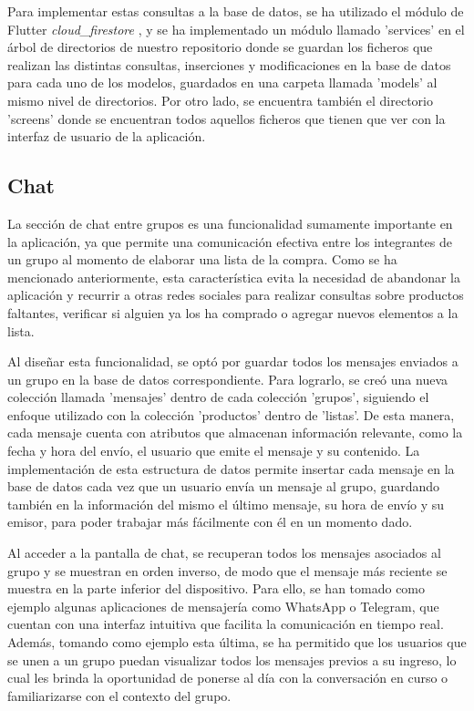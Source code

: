 \documentclass{article}
\begin{document}
Para implementar estas consultas a la base de datos, se ha utilizado el módulo de Flutter \textit{cloud\_firestore} \cite{Firebase Cloud Firestore}, y se ha implementado un módulo llamado 'services' en el árbol de directorios de nuestro repositorio donde se guardan los ficheros que realizan las distintas consultas, inserciones y modificaciones en la base de datos para cada uno de los modelos, guardados en una carpeta llamada 'models' al mismo nivel de directorios. Por otro lado, se encuentra también el directorio 'screens' donde se encuentran todos aquellos ficheros que tienen que ver con la interfaz de usuario de la aplicación.

\subsection{Chat}

La sección de chat entre grupos es una funcionalidad sumamente importante en la aplicación, ya que permite una comunicación efectiva entre los integrantes de un grupo al momento de elaborar una lista de la compra. Como se ha mencionado anteriormente, esta característica evita la necesidad de abandonar la aplicación y recurrir a otras redes sociales para realizar consultas sobre productos faltantes, verificar si alguien ya los ha comprado o agregar nuevos elementos a la lista.

Al diseñar esta funcionalidad, se optó por guardar todos los mensajes enviados a un grupo en la base de datos correspondiente. Para lograrlo, se creó una nueva colección llamada 'mensajes' dentro de cada colección 'grupos', siguiendo el enfoque utilizado con la colección 'productos' dentro de 'listas'. De esta manera, cada mensaje cuenta con atributos que almacenan información relevante, como la fecha y hora del envío, el usuario que emite el mensaje y su contenido. La implementación de esta estructura de datos permite insertar cada mensaje en la base de datos cada vez que un usuario envía un mensaje al grupo, guardando también en la información del mismo el último mensaje, su hora de envío y su emisor, para poder trabajar más fácilmente con él en un momento dado.

Al acceder a la pantalla de chat, se recuperan todos los mensajes asociados al grupo y se muestran en orden inverso, de modo que el mensaje más reciente se muestra en la parte inferior del dispositivo. Para ello, se han tomado como ejemplo algunas aplicaciones de mensajería como WhatsApp o Telegram, que cuentan con una interfaz intuitiva que facilita la comunicación en tiempo real. Además, tomando como ejemplo esta última, se ha permitido que los usuarios que se unen a un grupo puedan visualizar todos los mensajes previos a su ingreso, lo cual les brinda la oportunidad de ponerse al día con la conversación en curso o familiarizarse con el contexto del grupo.
\end{document}
